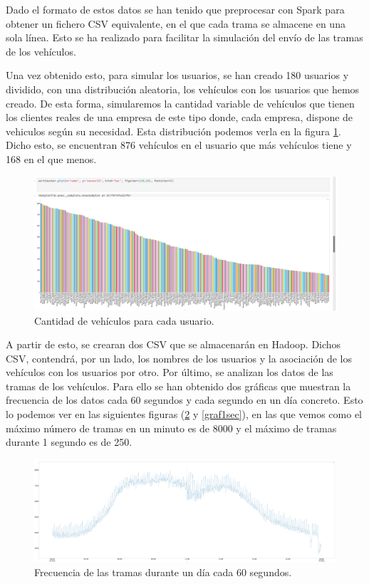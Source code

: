 Dado el formato de estos datos se han tenido que preprocesar con Spark
para obtener un fichero CSV equivalente, en el que cada trama se almacene
en una sola línea. Esto se ha realizado para facilitar la simulación del
envío de las tramas de los vehículos.

Una vez obtenido esto, para simular los usuarios, se han creado 180
usuarios y dividido, con una distribución aleatoria, los vehículos con
los usuarios que hemos creado. De esta forma, simularemos la cantidad variable de
vehículos que tienen los clientes reales de una empresa de este tipo donde,
cada empresa, dispone de vehiculos según su necesidad. Esta
distribución podemos verla en la figura \ref{userGraf}. Dicho esto, 
se encuentran 876 vehículos en el usuario que más
vehículos tiene y 168 en el que menos.

\begin{figure}[htp]
\centering
\includegraphics[scale=0.3]{Imagenes/graf1.png}
\caption{Cantidad de vehículos para cada usuario.}
\label{userGraf}
\end{figure}

A partir de esto, se crearan dos CSV que se almacenarán en Hadoop. Dichos CSV,
contendrá, por un lado, los nombres de los usuarios y la asociación de los vehículos con
los usuarios por otro. Por último, se analizan los datos de las tramas de los
vehículos. Para ello se han obtenido dos gráficas que muestran la frecuencia de
los datos cada 60 segundos y cada segundo en un día concreto. Esto lo
podemos ver en las siguientes figuras (\ref{graf60sec} y \ref{graf1sec}),
en las que vemos como el máximo número de tramas en un minuto es de 8000 y
el máximo de tramas durante 1 segundo es de 250.

\begin{figure}[htp]
\centering
\includegraphics[scale=0.26]{Imagenes/graf2.png}
\caption{Frecuencia de las tramas durante un día cada 60 segundos.}
\label{graf60sec}
\end{figure}


